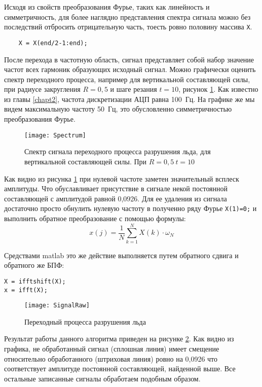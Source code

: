 Исходя из свойств преобразования Фурье, таких как линейность и симметричность, для более наглядно представления спектра сигнала можно без последствий отбросить отрицательную часть, тоесть ровно половину массива \verb|X|. 
\begin{lstlisting}
	X = X(end/2-1:end);
\end{lstlisting}

После перехода в частотную область, сигнал представляет собой набор значение частот всех гармоник образующих исходный сигнал. Можно графически оценить спектр переходного процесса, например для вертикальной составляющей силы, при радиусе закругления $ R=0,5 $ и шаге резания $ t=10 $, рисунок \ref{img:Spectrum}. Как известно из главы \ref{chapt2}, частота дискретизации АЦП равна 100~Гц. На графике же мы видем максимальную частоту 50~Гц, это обусловленно симметричностью преобразования Фурье. 
\begin{figure}[ht] 
	\center
	\texttt{[image: Spectrum]}
	\caption{Спектр сигнала переходного процесса разрушения льда, для вертикальной составляющей силы. При $ R=0,5\ t=10 $} 
	\label{img:Spectrum}  
\end{figure}

Как видно из рисунка \ref{img:Spectrum} при нулевой частоте заметен значительный всплеск амплитуды. Что обуславливает присутствие в сигнале некой постоянной составляющей с амплитудой равной 0,0926.  Для ее удаления из сигнала достаточно просто обнулить нулевую частоту в полученно ряду Фурье \verb|X(1)=0;| и выполнить обратное преобразование с помощью формулы:
\begin{equation}\label{eq:iFFT}
x(j)=\frac{1}{N}\sum_{k=1}^{N} X(k)\cdot\omega_{N}
\end{equation}

Средствами matlab это же действие выполняется путем обратного сдвига и обратного же БПФ:
\begin{lstlisting}
X = ifftshift(X);
x = ifft(X);
\end{lstlisting}
\begin{figure}[ht] 
	\center
	\texttt{[image: SignalRaw]}
	\caption{Переходный процесса разрушения льда} 
	\label{img:SignalRaw}  
\end{figure}

Результат работы данного алгоритма приведен на рисунке \ref{img:SignalRaw}. Как видно из графика, не обработанный сигнал (сплошная линия) имеет смещение относительно обработанного (штриховая линия) ровно на 0,0926 что соответствует амплитуде постоянной составляющей, найденной выше. Все остальные записанные сигналы обработаем подобным образом.


